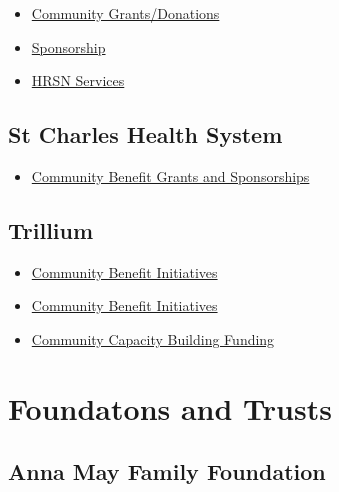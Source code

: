 \documentclass[
  letterpaper,
  DIV=11,
  numbers=noendperiod]{scrreprt}
\providecommand{\tightlist}{%
  \setlength{\itemsep}{0pt}\setlength{\parskip}{0pt}}\usepackage{longtable,booktabs,array}
\begin{document}
\begin{itemize}
\tightlist
\item
  \href{https://www.providence.org/locations/wa/providence-regional-medical-center-everett/donate-and-volunteer/community-sponsorships}{Community
  Grants/Donations}
\item
  \href{https://webportalapp.com/sp/login/prmce-sponsor-application}{Sponsorship}
\item
  \href{HRSNBenefit@Providence.org}{HRSN Services}
\end{itemize}

\subsection{St Charles Health System}\label{st-charles-health-system}

\begin{itemize}
\tightlist
\item
  \href{https://www.stcharleshealthcare.org/community-health/community-benefit-grants-and-sponsorships}{Community
  Benefit Grants and Sponsorships}
\end{itemize}

\subsection{Trillium}\label{trillium}

\begin{itemize}
\tightlist
\item
  \href{https://www.prnewswire.com/news-releases/trillium-community-health-plan-announces-request-for-applications-for-2023-small-grants-for-community-benefit-initiatives-301845411.html}{Community
  Benefit Initiatives}
\item
  \href{https://www.trilliumohp.com/supporting-oregon-communities/community-benefit-initiatives.html}{Community
  Benefit Initiatives}
\item
  \href{https://www.trilliumohp.com/supporting-oregon-communities/health-related-social-needs/community-capacity-building-funding.html}{Community
  Capacity Building Funding}
\end{itemize}

\section{Foundatons and Trusts}\label{foundatons-and-trusts}

\subsection{Anna May Family
Foundation}\label{anna-may-family-foundation}
\end{document}
